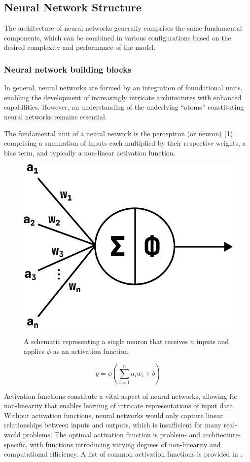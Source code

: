 \subsection{Neural Network Structure}
The architecture of neural networks generally comprises the same fundamental components, which can be combined in various configurations based on the desired complexity and performance of the model.

\subsubsection{Neural network building blocks}
In general, neural networks are formed by an integration of foundational units, enabling the development of increasingly intricate architectures with enhanced capabilities.
However, an understanding of the underlying ``atoms'' constituting neural networks remains essential.

The fundamental unit of a neural network is the perceptron (or neuron) (\cref{fig:neuron}), comprising a summation of inputs each multiplied by their respective weights, a bias term, and typically a non-linear activation function.

\begin{figure}[h!]
    \begin{center}
        {\includegraphics[width=0.55\linewidth]{figs/background/png/neuron.png}}
    \end{center}
    \caption{A schematic representing a single neuron that receives $n$ inputs and applies $\phi$ as an activation function.}
    \label{fig:neuron}
\end{figure}

\begin{equation}
    y = \phi(\sum_{i=1}^{n}a_i w_i + b)
    \label{eq:neuron}
\end{equation}

Activation functions constitute a vital aspect of neural networks, allowing for non-linearity that enables learning of intricate representations of input data.
Without activation functions, neural networks would only capture linear relationships between inputs and outputs, which is insufficient for many real-world problems.
The optimal activation function is problem- and architecture-specific, with functions introducing varying degrees of non-linearity and computational efficiency.
A list of common activation functions is provided in .

